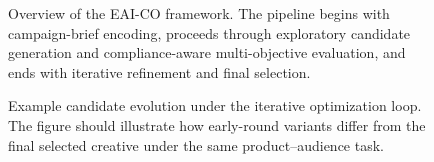 \documentclass[applsci,article,submit,pdftex,moreauthors]{Definitions/mdpi}
\begin{document}
\begin{figure}[H]
\centering
\fbox{\rule{0pt}{2.0in}\rule{0.92\linewidth}{0pt}}
\caption{Overview of the EAI-CO framework. The pipeline begins with campaign-brief encoding, proceeds through exploratory candidate generation and compliance-aware multi-objective evaluation, and ends with iterative refinement and final selection.}
\label{fig:eai_co_pipeline}
\end{figure}

\begin{figure}[H]
\centering
\fbox{\rule{0pt}{2.0in}\rule{0.92\linewidth}{0pt}}
\caption{Example candidate evolution under the iterative optimization loop. The figure should illustrate how early-round variants differ from the final selected creative under the same product--audience task.}
\label{fig:candidate_evolution}
\end{figure}
\end{document}

